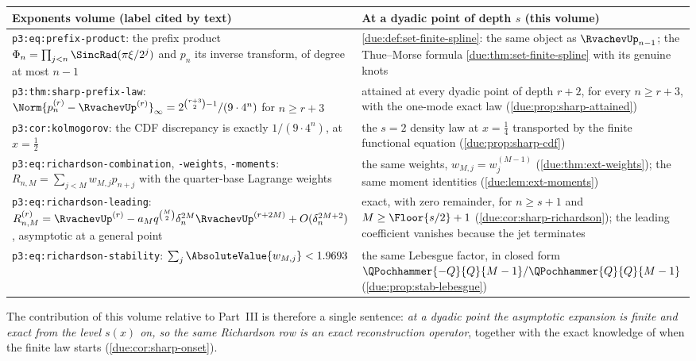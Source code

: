 \documentclass[11pt,oneside]{article}
\theoremstyle{plain}
\theoremstyle{definition}
\theoremstyle{remark}
\newcommand{\upn}[1]{\RvachevUp_{#1}}
\newcommand{\dep}[1]{s\!\left(#1\right)}                    %
\newcommand{\Qq}{Q}                                         %
\newcommand{\am}[1]{a_{#1}}                                 %
\newcommand{\Wrow}[2]{w^{(#1)}_{#2}}                        %
\begin{document}
\begin{center}
\small
\begin{tabular}{@{}>{\raggedright\arraybackslash}p{}>{\raggedright\arraybackslash}p{}@{}}
\toprule
Exponents volume (label cited by text) & At a dyadic point of depth $s$ (this volume)\\
\midrule
\texttt{p3:eq:prefix-product}: the prefix product $\Phi_{n}=\prod_{j<n}\SincRad(\pi\xi/2^{j})$ and $p_{n}$ its inverse transform, of degree at most $n-1$
& \cref{due:def:set-finite-spline}: the same object as $\upn{n-1}$; the Thue--Morse formula \cref{due:thm:set-finite-spline} with its genuine knots\\[0.3em]
\texttt{p3:thm:sharp-prefix-law}: $\Norm{p_{n}^{(r)}-\RvachevUp^{(r)}}_{\infty}=2^{\binom{r+3}{2}-1}/(9\cdot4^{n})$ for $n\ge r+3$
& attained at every dyadic point of depth $r+2$, for every $n\ge r+3$, with the one-mode exact law (\cref{due:prop:sharp-attained})\\[0.3em]
\texttt{p3:cor:kolmogorov}: the CDF discrepancy is exactly $1/(9\cdot4^{n})$, at $x=\tfrac12$
& the $s=2$ density law at $x=\tfrac14$ transported by the finite functional equation (\cref{due:prop:sharp-cdf})\\[0.3em]
\texttt{p3:eq:richardson-\allowbreak combination}, \texttt{-weights}, \texttt{-moments}: $R_{n,M}=\sum_{j<M}w_{M,j}p_{n+j}$ with the quarter-base Lagrange weights
& the same weights, $w_{M,j}=\Wrow{M-1}{j}$ (\cref{due:thm:ext-weights}); the same moment identities (\cref{due:lem:ext-moments})\\[0.3em]
\texttt{p3:eq:richardson-\allowbreak leading}: $R^{(r)}_{n,M}=\RvachevUp^{(r)}-\am{M}q^{\binom M2}\delta_{n}^{2M}\RvachevUp^{(r+2M)}+O(\delta_{n}^{2M+2})$, asymptotic at a general point
& exact, with zero remainder, for $n\ge s+1$ and $M\ge\Floor{s/2}+1$ (\cref{due:cor:sharp-richardson}); the leading coefficient vanishes because the jet terminates\\[0.3em]
\texttt{p3:eq:richardson-\allowbreak stability}: $\sum_{j}\AbsoluteValue{w_{M,j}}<1.9693$
& the same Lebesgue factor, in closed form $\QPochhammer{-\Qq}{\Qq}{M-1}/\QPochhammer{\Qq}{\Qq}{M-1}$ (\cref{due:prop:stab-lebesgue})\\
\bottomrule
\end{tabular}
\end{center}

The contribution of this volume relative to Part~III is therefore a single
sentence: \emph{at a dyadic point the asymptotic expansion is finite and
exact from the level $\dep{x}$ on, so the same Richardson row is an exact
reconstruction operator}, together with the exact knowledge of when the
finite law starts (\cref{due:cor:sharp-onset}).
\end{document}

